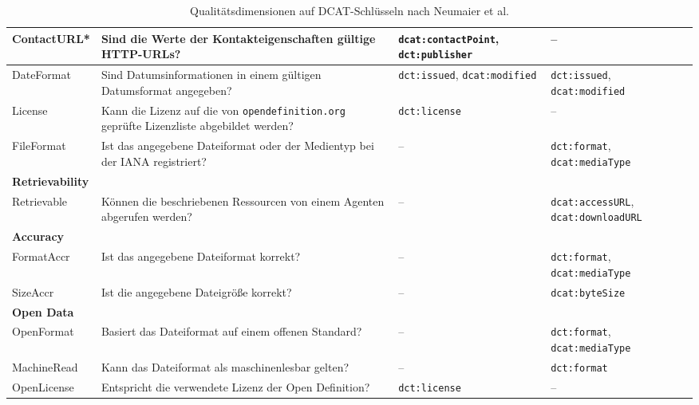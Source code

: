 \begin{table}[h!]
\begin{tabular}{|p{2cm}|p{5.8cm}|p{3.1cm}|p{3.1cm}|}
ContactURL* & Sind die Werte der Kontakteigenschaften gültige HTTP-URLs? 
& \texttt{dcat:contactPoint}, \texttt{dct:publisher} 
& -- \\ \hline

DateFormat & Sind Datumsinformationen in einem gültigen Datumsformat angegeben? 
& \texttt{dct:issued}, \texttt{dcat:modified} 
& \texttt{dct:issued}, \texttt{dcat:modified} \\ \hline

License & Kann die Lizenz auf die von \texttt{opendefinition.org} geprüfte Lizenzliste abgebildet werden? 
& \texttt{dct:license} 
& -- \\ \hline

FileFormat & Ist das angegebene Dateiformat oder der Medientyp bei der \acrfull{IANA} registriert?
& -- 
& \texttt{dct:format}, \texttt{dcat:mediaType} \\ \hline

\multicolumn{4}{|l|}{\textbf{Retrievability}} \\ \hline
Retrievable & Können die beschriebenen Ressourcen von einem Agenten abgerufen werden? 
& -- 
& \texttt{dcat:accessURL}, \texttt{dcat:downloadURL} \\ \hline

\multicolumn{4}{|l|}{\textbf{Accuracy}} \\ \hline
FormatAccr & Ist das angegebene Dateiformat korrekt? 
& -- 
& \texttt{dct:format}, \texttt{dcat:mediaType} \\ \hline

SizeAccr & Ist die angegebene Dateigröße korrekt? 
& -- 
& \texttt{dcat:byteSize} \\ \hline

\multicolumn{4}{|l|}{\textbf{Open Data}} \\ \hline
OpenFormat & Basiert das Dateiformat auf einem offenen Standard? 
& -- 
& \texttt{dct:format}, \texttt{dcat:mediaType} \\ \hline

MachineRead & Kann das Dateiformat als maschinenlesbar gelten? 
& -- 
& \texttt{dct:format} \\ \hline

OpenLicense & Entspricht die verwendete Lizenz der Open Definition? 
& \texttt{dct:license} 
& -- \\ \hline

\end{tabular}
\captionsetup{justification=centering}
\caption[Qualitätsdimensionen auf DCAT-Schlüsseln nach Neumaier et al.]{Qualitätsdimensionen auf DCAT-Schlüsseln nach Neumaier et al. \cite{Neumaier2016MetadataQuality}}
\label{tab:neumaier_metrics}
\end{table}

